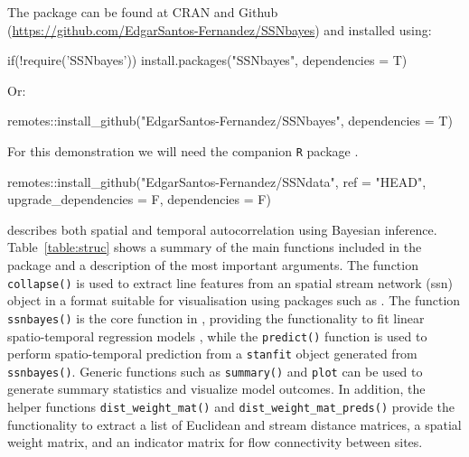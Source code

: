 The  package can be found at CRAN and Github (\url{https://github.com/EdgarSantos-Fernandez/SSNbayes}) and installed using:

\begin{example}
if(!require('SSNbayes')) install.packages("SSNbayes", dependencies = T)
\end{example}

\noindent Or: 

\begin{example}
remotes::install_github("EdgarSantos-Fernandez/SSNbayes", dependencies = T)    
\end{example}

For this demonstration we will need the companion \texttt{R}  package  \citep{SSNdata}.

\begin{example}
remotes::install_github("EdgarSantos-Fernandez/SSNdata", 
    ref = "HEAD", upgrade_dependencies = F, dependencies = F)
\end{example}

 describes both spatial and temporal autocorrelation using Bayesian inference.
Table~\ref{table:struc} shows a summary of the main functions included in the package and a description of the most important arguments. 
The function \texttt{collapse()} is used to extract line features from an spatial stream network (ssn) object in a format suitable for visualisation using packages such as . The function \texttt{ssnbayes()} is the core function in , providing the functionality to fit linear spatio-temporal regression models \citep{santos2022bayesian}, while the \texttt{predict()} function is used to perform spatio-temporal prediction from a \texttt{stanfit} object generated from \texttt{ssnbayes()}. 
Generic functions such as \texttt{summary()} and \texttt{plot} can be used to generate summary statistics and visualize model outcomes.
In addition,  the helper functions \texttt{dist\_weight\_mat()} and \texttt{dist\_weight\_mat\_preds()} provide the functionality to extract a list of Euclidean and stream distance matrices, a spatial weight matrix, and an indicator matrix for flow connectivity between sites. 

